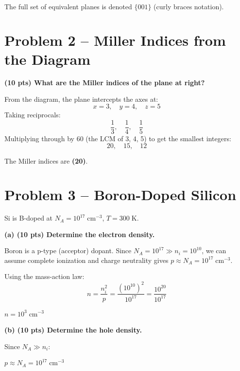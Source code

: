 \documentclass[11pt]{article}
\begin{document}
\begin{answerbox}
  The full set of equivalent planes is denoted $\{001\}$ (curly braces notation).
\end{answerbox}

\newpage

\section*{Problem 2 -- Miller Indices from the Diagram}

\textbf{(10 pts) What are the Miller indices of the plane at right?}

From the diagram, the plane intercepts the axes at:
\[
  x = 3, \quad y = 4, \quad z = 5
\]
Taking reciprocals:
\[
  \frac{1}{3},\quad \frac{1}{4},\quad \frac{1}{5}
\]
Multiplying through by 60 (the LCM of 3, 4, 5) to get the smallest integers:
\[
  20,\quad 15,\quad 12
\]

\begin{answerbox}
  The Miller indices are \textbf{(20)}.
\end{answerbox}

\newpage

\section*{Problem 3 -- Boron-Doped Silicon}

Si is B-doped at $N_A = 10^{17}\;\text{cm}^{-3}$, $T = 300\;\text{K}$.

\textbf{(a) (10 pts) Determine the electron density.}

Boron is a p-type (acceptor) dopant. Since $N_A = 10^{17} \gg n_i = 10^{10}$, we can assume complete ionization and charge neutrality gives $p \approx N_A = 10^{17}\;\text{cm}^{-3}$.

Using the mass-action law:
\[
  n = \frac{n_i^2}{p} = \frac{(10^{10})^2}{10^{17}} = \frac{10^{20}}{10^{17}}
\]

\begin{answerbox}
  $n = 10^{3}\;\text{cm}^{-3}$
\end{answerbox}

\textbf{(b) (10 pts) Determine the hole density.}

Since $N_A \gg n_i$:

\begin{answerbox}
  $p \approx N_A = 10^{17}\;\text{cm}^{-3}$
\end{answerbox}
\end{document}
